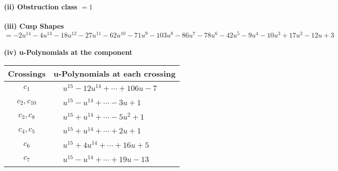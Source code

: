 \documentclass[1p]{elsarticle_modified}
\theoremstyle{definition}
\begin{document}
\flushleft \textbf{(ii) Obstruction class $= 1$}\\~\\
\flushleft \textbf{(iii) Cusp Shapes $= -2 u^{14}-4 u^{13}-18 u^{12}-27 u^{11}-62 u^{10}-71 u^9-103 u^8-86 u^7-78 u^6-42 u^5-9 u^4-10 u^3+17 u^2-12 u+3$}\\~\\
\newpage\renewcommand{\arraystretch}{1}
\flushleft \textbf{(iv) u-Polynomials at the component}\newline \\
\begin{tabular}{m{50pt}|m{274pt}}
Crossings & \hspace{64pt}u-Polynomials at each crossing \\
\hline $$\begin{aligned}c_{1}\end{aligned}$$&$\begin{aligned}
&u^{15}-12 u^{14}+\cdots+106 u-7
\end{aligned}$\\
\hline $$\begin{aligned}c_{2},c_{10}\end{aligned}$$&$\begin{aligned}
&u^{15}- u^{14}+\cdots-3 u+1
\end{aligned}$\\
\hline $$\begin{aligned}c_{3},c_{8}\end{aligned}$$&$\begin{aligned}
&u^{15}+u^{14}+\cdots-5 u^2+1
\end{aligned}$\\
\hline $$\begin{aligned}c_{4},c_{5}\end{aligned}$$&$\begin{aligned}
&u^{15}+u^{14}+\cdots+2 u+1
\end{aligned}$\\
\hline $$\begin{aligned}c_{6}\end{aligned}$$&$\begin{aligned}
&u^{15}+4 u^{14}+\cdots+16 u+5
\end{aligned}$\\
\hline $$\begin{aligned}c_{7}\end{aligned}$$&$\begin{aligned}
&u^{15}- u^{14}+\cdots+19 u-13
\end{aligned}$\\

\end{tabular}
\end{document}

